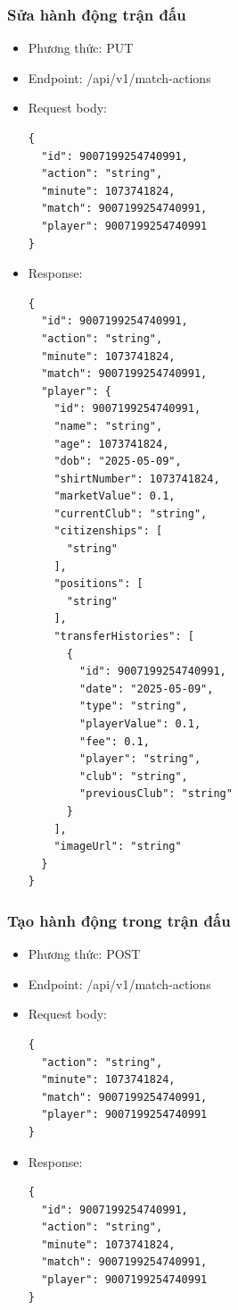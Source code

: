 \documentclass[../BTL.tex]{subfiles}
\begin{document}
\subsubsection{ Sửa hành động trận đấu}
\begin{itemize}
    \item Phương thức: PUT
    \item Endpoint: /api/v1/match-actions
    \item Request body: 
        \begin{verbatim}
{
  "id": 9007199254740991,
  "action": "string",
  "minute": 1073741824,
  "match": 9007199254740991,
  "player": 9007199254740991
}
        \end{verbatim}
    \item Response:
        \begin{verbatim}
{
  "id": 9007199254740991,
  "action": "string",
  "minute": 1073741824,
  "match": 9007199254740991,
  "player": {
    "id": 9007199254740991,
    "name": "string",
    "age": 1073741824,
    "dob": "2025-05-09",
    "shirtNumber": 1073741824,
    "marketValue": 0.1,
    "currentClub": "string",
    "citizenships": [
      "string"
    ],
    "positions": [
      "string"
    ],
    "transferHistories": [
      {
        "id": 9007199254740991,
        "date": "2025-05-09",
        "type": "string",
        "playerValue": 0.1,
        "fee": 0.1,
        "player": "string",
        "club": "string",
        "previousClub": "string"
      }
    ],
    "imageUrl": "string"
  }
}
        \end{verbatim}
\end{itemize}

\subsubsection{ Tạo hành động trong trận đấu}
\begin{itemize}
    \item Phương thức: POST
    \item Endpoint: /api/v1/match-actions
    \item Request body: 
        \begin{verbatim}
{
  "action": "string",
  "minute": 1073741824,
  "match": 9007199254740991,
  "player": 9007199254740991
}
        \end{verbatim}
    \item Response:
        \begin{verbatim}
{
  "id": 9007199254740991,
  "action": "string",
  "minute": 1073741824,
  "match": 9007199254740991,
  "player": 9007199254740991
}
        \end{verbatim}
\end{itemize}
\end{document}
